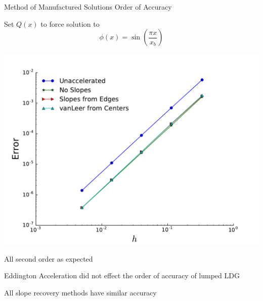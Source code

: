 \documentclass[10pt]{beamer}
\begin{document}
\begin{frame}{Method of Manufactured Solutions Order of Accuracy} 

	\footnotesize
	Set $Q(x)$ to force solution to 
	\begin{equation*}
		\phi(x) = \sin\left(\frac{\pi x}{x_b}\right)
	\end{equation*}

	\pause
	\centerline{\includegraphics[width=.5\paperwidth]{figs/ooa.pdf}}

	\pause 
	All second order as expected 

	\pause
	Eddington Acceleration did not effect the order of accuracy of lumped LDG 

	\pause 
	All slope recovery methods have similar accuracy 

\end{frame}
\end{document}

